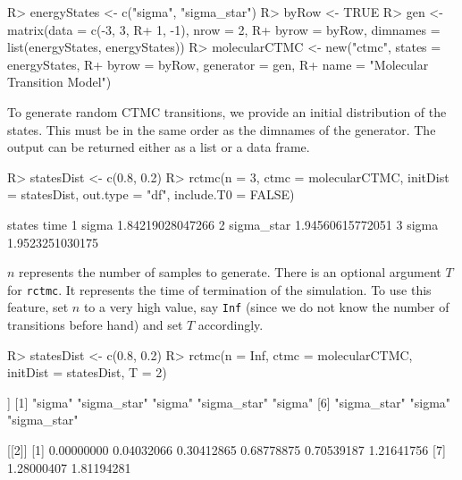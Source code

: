 \documentclass[
  nojss]{jss}
\begin{document}
\begin{CodeChunk}

\begin{CodeInput}
R> energyStates <- c("sigma", "sigma_star")
R> byRow <- TRUE
R> gen <- matrix(data = c(-3, 3,
R+                        1, -1), nrow = 2,
R+               byrow = byRow, dimnames = list(energyStates, energyStates))
R> molecularCTMC <- new("ctmc", states = energyStates, 
R+                  byrow = byRow, generator = gen, 
R+                  name = "Molecular Transition Model")      
\end{CodeInput}
\end{CodeChunk}

To generate random CTMC transitions, we provide an initial distribution of the states. This must be in the same order as the dimnames of the generator. The output can be returned either as a list or a data frame.

\begin{CodeChunk}

\begin{CodeInput}
R> statesDist <- c(0.8, 0.2)
R> rctmc(n = 3, ctmc = molecularCTMC, initDist = statesDist, out.type = "df", include.T0 = FALSE)
\end{CodeInput}

\begin{CodeOutput}
      states             time
1      sigma 1.84219028047266
2 sigma_star 1.94560615772051
3      sigma  1.9523251030175
\end{CodeOutput}
\end{CodeChunk}

\(n\) represents the number of samples to generate. There is an optional argument \(T\) for \texttt{rctmc}. It represents the time of termination of the simulation. To use this feature, set \(n\) to a very high value, say \texttt{Inf} (since we do not know the number of transitions before hand) and set \(T\) accordingly.

\begin{CodeChunk}

\begin{CodeInput}
R> statesDist <- c(0.8, 0.2)
R> rctmc(n = Inf, ctmc = molecularCTMC, initDist = statesDist, T = 2)
\end{CodeInput}

\begin{CodeOutput}
[[1]]
[1] "sigma"      "sigma_star" "sigma"      "sigma_star" "sigma"     
[6] "sigma_star" "sigma"      "sigma_star"

[[2]]
[1] 0.00000000 0.04032066 0.30412865 0.68778875 0.70539187 1.21641756
[7] 1.28000407 1.81194281
\end{CodeOutput}
\end{CodeChunk}
\end{document}

